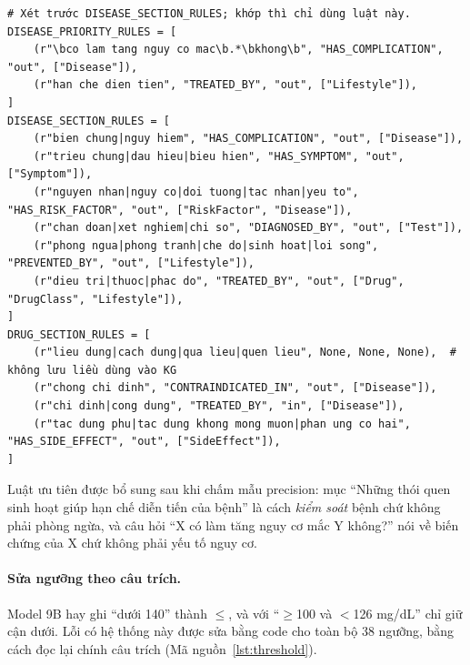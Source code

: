\documentclass[12pt,a4paper]{report}
\begin{document}
\begin{listing}[H]
\begin{verbatim}
# Xét trước DISEASE_SECTION_RULES; khớp thì chỉ dùng luật này.
DISEASE_PRIORITY_RULES = [
    (r"\bco lam tang nguy co mac\b.*\bkhong\b", "HAS_COMPLICATION", "out", ["Disease"]),
    (r"han che dien tien", "TREATED_BY", "out", ["Lifestyle"]),
]
DISEASE_SECTION_RULES = [
    (r"bien chung|nguy hiem", "HAS_COMPLICATION", "out", ["Disease"]),
    (r"trieu chung|dau hieu|bieu hien", "HAS_SYMPTOM", "out", ["Symptom"]),
    (r"nguyen nhan|nguy co|doi tuong|tac nhan|yeu to", "HAS_RISK_FACTOR", "out", ["RiskFactor", "Disease"]),
    (r"chan doan|xet nghiem|chi so", "DIAGNOSED_BY", "out", ["Test"]),
    (r"phong ngua|phong tranh|che do|sinh hoat|loi song", "PREVENTED_BY", "out", ["Lifestyle"]),
    (r"dieu tri|thuoc|phac do", "TREATED_BY", "out", ["Drug", "DrugClass", "Lifestyle"]),
]
DRUG_SECTION_RULES = [
    (r"lieu dung|cach dung|qua lieu|quen lieu", None, None, None),  # không lưu liều dùng vào KG
    (r"chong chi dinh", "CONTRAINDICATED_IN", "out", ["Disease"]),
    (r"chi dinh|cong dung", "TREATED_BY", "in", ["Disease"]),
    (r"tac dung phu|tac dung khong mong muon|phan ung co hai", "HAS_SIDE_EFFECT", "out", ["SideEffect"]),
]
\end{verbatim}
\caption{Luật ánh xạ tên mục sang quan hệ (\texttt{kb/schema.py})}
\label{lst:rules}
\end{listing}

\noindent Luật ưu tiên được bổ sung sau khi chấm mẫu precision: mục ``Những thói quen sinh hoạt giúp
hạn chế diễn tiến của bệnh'' là cách \emph{kiểm soát} bệnh chứ không phải phòng ngừa, và câu hỏi
``X có làm tăng nguy cơ mắc Y không?'' nói về biến chứng của X chứ không phải yếu tố nguy cơ.

\paragraph{Sửa ngưỡng theo câu trích.} Model 9B hay ghi ``dưới 140'' thành $\leq$, và với
``$\geq$100 và $<$126 mg/dL'' chỉ giữ cận dưới. Lỗi có hệ thống này được sửa bằng code cho toàn
bộ 38 ngưỡng, bằng cách đọc lại chính câu trích (Mã nguồn~\ref{lst:threshold}).
\end{document}
